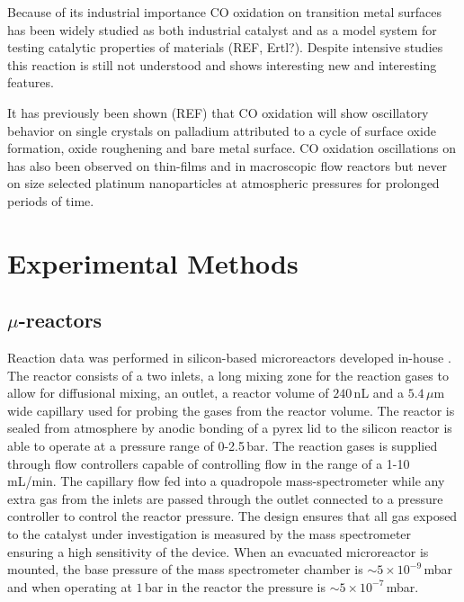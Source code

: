 \documentclass[8.5pt,twoside,twocolumn]{article}
\begin{document}


Because of its industrial importance CO oxidation on transition metal surfaces has been widely studied as both industrial catalyst and as a model system for testing catalytic properties of materials (REF, Ertl?). Despite intensive studies this reaction is still not understood and shows interesting new and interesting features. 

It has previously been shown (REF) that CO oxidation will show oscillatory behavior on single crystals on palladium \cite{Hendriksen2010} attributed to a cycle of surface oxide formation, oxide roughening and bare metal surface. CO oxidation oscillations on has also been observed on thin-films \cite{Lund2000} and in macroscopic flow reactors \cite{Singh2010} but never on size selected platinum nanoparticles at atmospheric pressures for prolonged periods of time.

\section{Experimental Methods}
\subsection{$\mu$-reactors}
Reaction data was performed in silicon-based microreactors developed in-house \cite{Henriksen2009}. The reactor consists of a two inlets, a long mixing zone for the reaction gases to allow for diffusional mixing, an outlet, a reactor volume of $240\,$nL and a $5.4\,\mu$m wide capillary used for probing the gases from the reactor volume. The reactor is sealed from atmosphere by anodic bonding of a pyrex lid to the silicon reactor is able to operate at a pressure range of 0-2.5\,bar. The reaction gases is supplied through flow controllers capable of controlling flow in the range of a 1-10 mL/min. The capillary flow fed into a quadropole mass-spectrometer while any extra gas from the inlets are passed through the outlet connected to a pressure controller to control the reactor pressure. The design ensures that all gas exposed to the catalyst under investigation is measured by the mass spectrometer ensuring a high sensitivity of the device. When an evacuated microreactor is mounted, the base pressure of the mass spectrometer chamber is $\sim5\times10^{-9}\,$mbar and when operating at $1\,$bar in the reactor the pressure is $\sim5\times10^{-7}\,$mbar.
\end{document}
